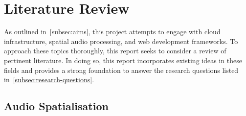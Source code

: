 
\thispagestyle{plain}
\newpage
\section{Literature Review}\label{sec:literature-review}

\normalsize

As outlined in~\ref{subsec:aims}, this project attempts to engage with cloud infrastructure, spatial audio processing, and web development frameworks.
To approach these topics thoroughly, this report seeks to consider a review of pertinent literature.
In doing so, this report incorporates existing ideas in these fields and provides a strong foundation to answer the research questions listed in~\ref{subsec:research-questions}.

\subsection{Audio Spatialisation}\label{subsec:audio-spatialisation}